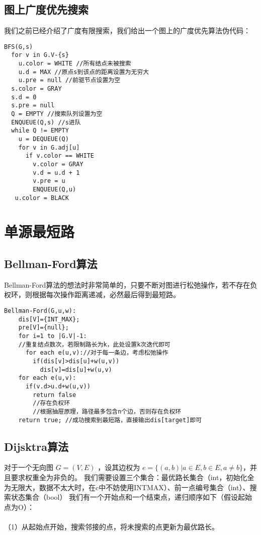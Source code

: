 \documentclass[12pt,a4paper,UTF16]{ctexbook}
\theoremstyle{plain}
\begin{document}
\subsection{图上广度优先搜索}
我们之前已经介绍了广度有限搜索，我们给出一个图上的广度优先算法伪代码：
\begin{lstlisting}[basicstyle=\ttfamily]
  BFS(G,s)
  for v in G.V-{s}
    u.color = WHITE //所有结点未被搜索
    u.d = MAX //原点s到该点的距离设置为无穷大
    u.pre = null //前驱节点设置为空
  s.color = GRAY
  s.d = 0
  s.pre = null
  Q = EMPTY //搜索队列设置为空
  ENQUEUE(Q,s) //s进队
  while Q != EMPTY
    u = DEQUEUE(Q)
    for v in G.adj[u]
      if v.color == WHITE
        v.color = GRAY 
        v.d = u.d + 1
        v.pre = u
        ENQUEUE(Q,u)
   u.color = BLACK
\end{lstlisting}
\section{单源最短路}
\subsection{Bellman-Ford算法}
Bellman-Ford算法的想法时非常简单的，只要不断对图进行松弛操作，若不存在负权环，则根据每次操作距离递减，必然最后得到最短路。
\begin{lstlisting}[basicstyle=\ttfamily]
  Bellman-Ford(G,u,w):
    dis[V]={INT_MAX};
    pre[V]={null};
    for i=1 to |G.V|-1:
    //重复结点数次，若限制路长为k，此处设置k次迭代即可
      for each e(u,v)://对于每一条边，考虑松弛操作
        if(dis[v]>dis[u]+w(u,v))
          dis[v]=dis[u]+w(u,v)
    for each e(u,v):
      if(v.d>u.d+w(u,v))
        return false 
        //存在负权环
        //根据抽屉原理，路径最多包含n个边，否则存在负权环
    return true; //成功搜索到最短路，直接输出dis[target]即可
\end{lstlisting}
\subsection{Dijsktra算法}
对于一个无向图 
$G=(V,E)$
 ，设其边权为 
$e=\{(a,b)|a\in E,b\in E, a\ne b\}$，并且要求权重全为非负的。
我们需要设置三个集合：最优路长集合（int，初始化全为无限大，数据不太大时，在c中不妨使用INTMAX）、前一点编号集合（int）、搜索状态集合（bool）
我们有一个开始点和一个结束点，递归顺序如下（假设起始点为O）：
\paragraph{}（1）从起始点开始，搜索邻接的点，将未搜索的点更新为最优路长。
\end{document}
